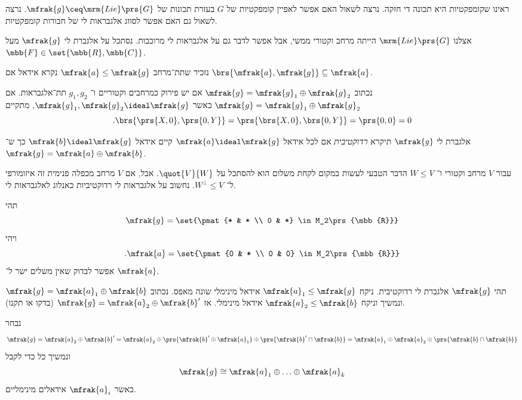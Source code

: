 \documentclass[10pt, twoside]{book}
\newcommand{\Lie}{\mrm{Lie}}
\begin{document}
ראינו שקומפקטיות היא תכונה די חזקה. נרצה לשאול האם אפשר לאפיין קומפקטיות של
$G$
בעזרת תכונות של
$\mfrak{g} \ceq \Lie\prs{G}$.
נרצה לשאול גם האם אפשר לסווג אלגבראות לי של חבורות קומפקטיות.

אצלנו
$\Lie\prs{G}$
הייתה מרחב וקטורי ממשי, אבל אפשר לדבר גם על אלגבראות לי מרוכבות.
נסתכל על אלגברת לי
$\mfrak{g}$
מעל
$\mbb{F} \in \set{\mbb{R}, \mbb{C}}$.

נזכיר שתת־מרחב
$\mfrak{a} \leq \mfrak{g}$
נקרא אידאל אם
$\brs{\mfrak{a}, \mfrak{g}} \subseteq \mfrak{a}$.

נכתוב
$\mfrak{g} = \mfrak{g}_1 \oplus \mfrak{g}_2$
אם יש פירוק כמרחבים וקטוריים ו־%
$g_1, g_2$
תת־אלגבראות.
אם
$\mfrak{g} = \mfrak{g}_1 \oplus \mfrak{g}_2$
כאשר
$\mfrak{g}_1, \mfrak{g}_2 \ideal \mfrak{g}$,
מתקיים
\[\text{.}\brs{\prs{X, 0}, \prs{0,Y}} = \prs{\brs{X,0}, \brs{0,Y}} = \prs{0,0} = 0\]

\begin{definition}
אלגברת לי
$\mfrak{g}$
תיקרא
\emph{רדוקטיבית}
אם לכל אידאל
$\mfrak{a} \ideal \mfrak{g}$
קיים אידאל
$\mfrak{b} \ideal \mfrak{g}$
כך ש־%
$\mfrak{g} = \mfrak{a} \oplus \mfrak{b}$.
\end{definition}

\begin{remark}
עבור
$V$
מרחב וקטורי ו־%
$W \leq V$
הדבר הטבעי לעשות במקום לקחת משלום הוא להסתכל על
$\quot{V}{W}$.
אבל, אם
$V$
מרחב מכפלה פנימית זה איזומורפי ל־%
$W^\perp \leq V$.
נחשוב על אלגבראות לי רדוקטיביות כאנלוג לאלגבראות לי.
\end{remark}

\begin{example}
תהי
\[\mfrak{g} = \set{\pmat{* & * \\ 0 & *} \in M_2\prs{\mbb{R}}}\]
ויהי
\[\text{.}\mfrak{a} = \set{\pmat{0 & * \\ 0 & 0} \in M_2\prs{\mbb{R}}}\]
אפשר לבדוק שאין משלים ישר ל־%
$\mfrak{a}$.
\end{example}

תהי
$\mfrak{g}$
אלגברת לי רדוקטיבית. ניקח
$\mfrak{a}_1 \leq \mfrak{g}$
אידאל מינימלי שונה מאפס.
נכתוב
$\mfrak{g} = \mfrak{a}_1 \oplus \mfrak{b}$
ונמשיך וניקח
$\mfrak{a}_2 \leq \mfrak{b}$
אידאל מינימלי.
אז
$\mfrak{g} = \mfrak{a}_2 \oplus \mfrak{b}'$
(בדקו או תקנו).

נבחר
\[\mfrak{g} = \mfrak{a}_2 \oplus \mfrak{b}' = \mfrak{a}_2 \oplus \prs{\mfrak{b}' \oplus \mfrak{a}_1} \oplus \prs{\mfrak{b}' \cap \mfrak{b}} = \mfrak{a}_1 \oplus \mfrak{a}_2 \oplus \prs{\mfrak{b} \cap \mfrak{b}}\]
ונמשיך כל כדי לקבל
\[\mfrak{g} \cong \mfrak{a}_1 \oplus \ldots \oplus \mfrak{a}_k\]
כאשר
$\mfrak{a}_i$
אידאלים מינימליים.
\end{document}
